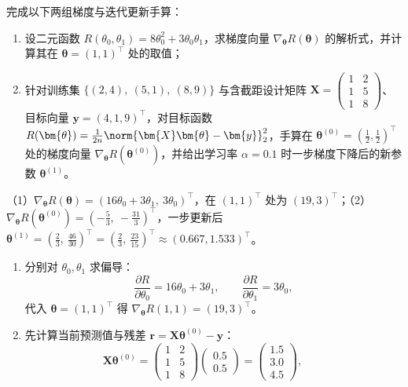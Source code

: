 \begin{exercise}[title={梯度向量手算与一步梯度下降更新},level=standard,points=15,tags={梯度下降,梯度推导,手算}]
完成以下两组梯度与迭代更新手算：
\begin{enumerate}
  \item 设二元函数 $R(\theta_0, \theta_1) = 8\theta_0^2 + 3\theta_0\theta_1$，求梯度向量 $\nabla_{\bm{\theta}}R(\bm{\theta})$ 的解析式，并计算其在 $\bm{\theta} = (1, 1)^\top$ 处的取值；
  \item 针对训练集 $\{(2, 4),\ (5, 1),\ (8, 9)\}$ 与含截距设计矩阵 $\bm{X} = \begin{pmatrix} 1 & 2 \\ 1 & 5 \\ 1 & 8 \end{pmatrix}$、目标向量 $\bm{y} = (4, 1, 9)^\top$，对目标函数 $R(\bm{\theta}) = \frac{1}{2n}\norm{\bm{X}\bm{\theta}-\bm{y}}_2^2$，手算在 $\bm{\theta}^{(0)} = (\frac{1}{2}, \frac{1}{2})^\top$ 处的梯度向量 $\nabla_{\bm{\theta}}R(\bm{\theta}^{(0)})$，并给出学习率 $\alpha = 0.1$ 时一步梯度下降后的新参数 $\bm{\theta}^{(1)}$。
\end{enumerate}
\begin{answer}
（1）$\nabla_{\bm{\theta}}R(\bm{\theta}) = (16\theta_0 + 3\theta_1,\ 3\theta_0)^\top$，在 $(1,1)^\top$ 处为 $(19, 3)^\top$；（2）$\nabla_{\bm{\theta}}R(\bm{\theta}^{(0)}) = (-\frac{5}{3},\ -\frac{31}{3})^\top$，一步更新后 $\bm{\theta}^{(1)} = (\frac{2}{3},\ \frac{46}{30})^\top = (\frac{2}{3},\ \frac{23}{15})^\top \approx (0.667, 1.533)^\top$。
\end{answer}
\begin{solution}
\begin{enumerate}
  \item 分别对 $\theta_0, \theta_1$ 求偏导：
  \[
    \frac{\partial R}{\partial \theta_0} = 16\theta_0 + 3\theta_1,\qquad
    \frac{\partial R}{\partial \theta_1} = 3\theta_0,
  \]
  代入 $\bm{\theta} = (1, 1)^\top$ 得 $\nabla_{\bm{\theta}}R(1, 1) = (19, 3)^\top$。
  \item 先计算当前预测值与残差 $\bm{r} = \bm{X}\bm{\theta}^{(0)} - \bm{y}$：
  \[
    \bm{X}\bm{\theta}^{(0)} = \begin{pmatrix} 1 & 2 \\ 1 & 5 \\ 1 & 8 \end{pmatrix}\begin{pmatrix} 0.5 \\ 0.5 \end{pmatrix} = \begin{pmatrix} 1.5 \\ 3.0 \\ 4.5 \end{pmatrix},\qquad
\]
\end{enumerate}
\end{solution}
\end{exercise}
